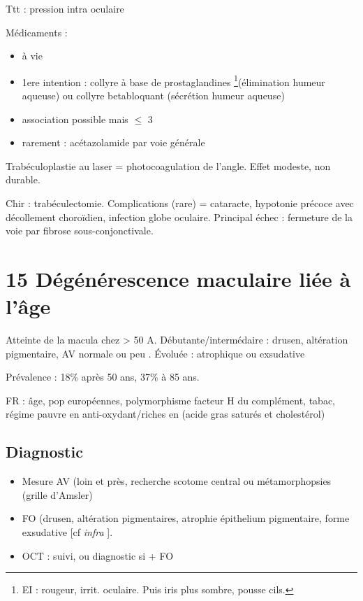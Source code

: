 \documentclass[11pt]{article}
\begin{document}
Ttt : \dec pression intra oculaire

Médicaments :
\begin{itemize}
\item à vie
\item 1ere intention : collyre à base de prostaglandines \footnote{EI : rougeur, irrit. oculaire. Puis iris plus sombre, \inc pousse cils.}(\inc élimination humeur
aqueuse) ou collyre betabloquant
(\dec sécrétion humeur aqueuse)
\item association possible mais \(\le\) 3
\item rarement : acétazolamide par voie générale
\end{itemize}

Trabéculoplastie au laser = photocoagulation de l'angle. Effet modeste, non durable.

Chir : trabéculectomie. Complications (rare) = cataracte, hypotonie précoce
avec décollement choroïdien, infection globe oculaire. Principal échec :
fermeture de la voie par fibrose sous-conjonctivale.

\section{15 Dégénérescence maculaire liée à l'âge}
\label{sec:org5bae956}
Atteinte de la macula chez > 50 A. Débutante/intermédaire : drusen, altération
pigmentaire, AV normale ou peu \dec. Évoluée : atrophique ou exsudative

Prévalence : 18\% après 50 ans, 37\% à 85 ans.

FR : âge, pop européennes, polymorphisme facteur H du complément, tabac, régime
pauvre en anti-oxydant/riches en (acide gras saturés et cholestérol)

\subsection{Diagnostic}
\label{sec:orgfc14313}
\begin{itemize}
\item Mesure AV (loin et près, recherche scotome central ou métamorphopsies (grille d'Amsler)
\item FO (drusen, altération pigmentaires, atrophie épithelium pigmentaire, forme
exsudative [cf \emph{infra} ].
\item OCT : suivi, ou diagnostic si + FO
\end{itemize}
\end{document}
